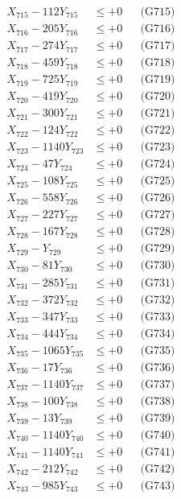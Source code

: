 \documentclass[a4paper,10pt]{article}
\begin{document}
{\begin{align}
X_{715} - 112Y_{715} &\leq +0 && \text{(G715)} \\
X_{716} - 205Y_{716} &\leq +0 && \text{(G716)} \\
X_{717} - 274Y_{717} &\leq +0 && \text{(G717)} \\
X_{718} - 459Y_{718} &\leq +0 && \text{(G718)} \\
X_{719} - 725Y_{719} &\leq +0 && \text{(G719)} \\
X_{720} - 419Y_{720} &\leq +0 && \text{(G720)} \\
\allowbreak
X_{721} - 300Y_{721} &\leq +0 && \text{(G721)} \\
X_{722} - 124Y_{722} &\leq +0 && \text{(G722)} \\
X_{723} - 1140Y_{723} &\leq +0 && \text{(G723)} \\
X_{724} - 47Y_{724} &\leq +0 && \text{(G724)} \\
X_{725} - 108Y_{725} &\leq +0 && \text{(G725)} \\
X_{726} - 558Y_{726} &\leq +0 && \text{(G726)} \\
X_{727} - 227Y_{727} &\leq +0 && \text{(G727)} \\
X_{728} - 167Y_{728} &\leq +0 && \text{(G728)} \\
X_{729} - Y_{729} &\leq +0 && \text{(G729)} \\
X_{730} - 81Y_{730} &\leq +0 && \text{(G730)} \\
\allowbreak
X_{731} - 285Y_{731} &\leq +0 && \text{(G731)} \\
X_{732} - 372Y_{732} &\leq +0 && \text{(G732)} \\
X_{733} - 347Y_{733} &\leq +0 && \text{(G733)} \\
X_{734} - 444Y_{734} &\leq +0 && \text{(G734)} \\
X_{735} - 1065Y_{735} &\leq +0 && \text{(G735)} \\
X_{736} - 17Y_{736} &\leq +0 && \text{(G736)} \\
X_{737} - 1140Y_{737} &\leq +0 && \text{(G737)} \\
X_{738} - 100Y_{738} &\leq +0 && \text{(G738)} \\
X_{739} - 13Y_{739} &\leq +0 && \text{(G739)} \\
X_{740} - 1140Y_{740} &\leq +0 && \text{(G740)} \\
\allowbreak
X_{741} - 1140Y_{741} &\leq +0 && \text{(G741)} \\
X_{742} - 212Y_{742} &\leq +0 && \text{(G742)} \\
X_{743} - 985Y_{743} &\leq +0 && \text{(G743)} \\

\end{align}}
\end{document}
